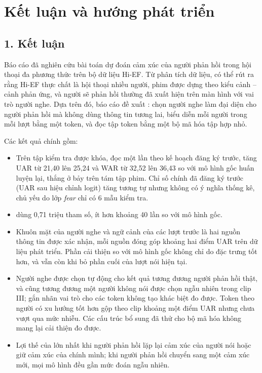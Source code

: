 \clearpage
{}
{}
\chapter*{Kết luận và hướng phát triển}
\label{chap:conclusion}

\section*{1. Kết luận}

Báo cáo đã nghiên cứu bài toán dự đoán cảm xúc của người phản hồi trong hội thoại đa phương thức trên bộ dữ liệu Hi-EF. Từ phân tích dữ liệu, có thể rút ra rằng Hi-EF thực chất là hội thoại nhiều người, phim được dựng theo kiểu cảnh -- cảnh phản ứng, và người sẽ phản hồi thường đã xuất hiện trên màn hình với vai trò người nghe. Dựa trên đó, báo cáo đề xuất \model{}: chọn người nghe làm đại diện cho người phản hồi mà không dùng thông tin tương lai, biểu diễn mỗi người trong mỗi lượt bằng một token, và đọc tập token bằng một bộ mã hóa tập hợp nhỏ.

Các kết quả chính gồm:
\renewcommand{\labelitemi}{$-$}
\begin{itemize}
	\item Trên tập kiểm tra được khóa, đọc một lần theo kế hoạch đăng ký trước, \model{} tăng UAR từ 21,40 lên 25,24 và WAR từ 32,52 lên 36,43 so với mô hình gốc huấn luyện lại, thắng ở bảy trên tám tập phim. Chỉ số chính đã đăng ký trước (UAR sau hiệu chỉnh logit) tăng tương tự nhưng không có ý nghĩa thống kê, chủ yếu do lớp \emph{fear} chỉ có 6 mẫu kiểm tra.
	\item \model{} dùng 0,71 triệu tham số, ít hơn khoảng 40 lần so với mô hình gốc.
	\item Khuôn mặt của người nghe và ngữ cảnh của các lượt trước là hai nguồn thông tin được xác nhận, mỗi nguồn đóng góp khoảng hai điểm UAR trên dữ liệu phát triển. Phần cải thiện so với mô hình gốc không chỉ do đặc trưng tốt hơn, và vẫn còn khi bỏ phần cuối của lượt nói hiện tại.
	\item Người nghe được chọn tự động cho kết quả tương đương người phản hồi thật, và cũng tương đương một người không nói được chọn ngẫu nhiên trong clip III; gắn nhãn vai trò cho các token không tạo khác biệt đo được. Token theo người có xu hướng tốt hơn gộp theo clip khoảng một điểm UAR nhưng chưa vượt qua mức nhiễu. Các cấu trúc bổ sung đã thử cho bộ mã hóa không mang lại cải thiện đo được.
	\item Lợi thế của \model{} lớn nhất khi người phản hồi lặp lại cảm xúc của người nói hoặc giữ cảm xúc của chính mình; khi người phản hồi chuyển sang một cảm xúc mới, mọi mô hình đều gần mức đoán ngẫu nhiên.
\end{itemize}


